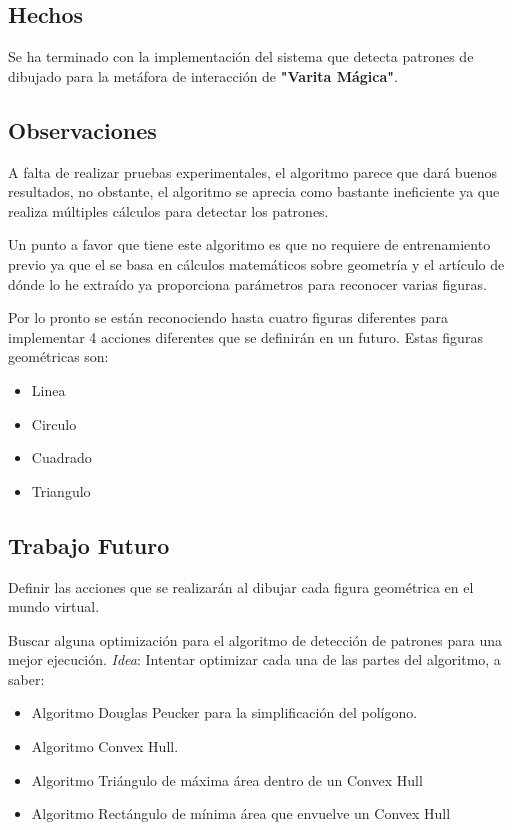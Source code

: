 \documentclass[12pt,a4paper]{article}
\begin{document}
\subsection{Hechos}

Se ha terminado con la implementación del sistema que detecta patrones de dibujado para la metáfora de interacción de \textbf{"Varita Mágica"}.

\subsection{Observaciones}

A falta de realizar pruebas experimentales, el algoritmo parece que dará buenos resultados, no obstante, el algoritmo se aprecia como bastante ineficiente ya que realiza múltiples cálculos para detectar los patrones.

Un punto a favor que tiene este algoritmo es que no requiere de entrenamiento previo ya que el se basa en cálculos matemáticos sobre geometría y el artículo de dónde lo he extraído \cite{Vanhatalo} ya proporciona parámetros para reconocer varias figuras.

Por lo pronto se están reconociendo hasta cuatro figuras diferentes para implementar 4 acciones diferentes que se definirán en un futuro. Estas figuras geométricas son:

\begin{itemize}
\item Linea
\item Circulo
\item Cuadrado
\item Triangulo
\end{itemize}

\subsection{Trabajo Futuro}

Definir las acciones que se realizarán al dibujar cada figura geométrica en el mundo virtual.

Buscar alguna optimización para el algoritmo de detección de patrones para una mejor ejecución. 
\textit{Idea}: Intentar optimizar cada una de las partes del algoritmo, a saber:

\begin{itemize}
\item Algoritmo Douglas Peucker para la simplificación del polígono.
\item Algoritmo Convex Hull.
\item Algoritmo Triángulo de máxima área dentro de un Convex Hull
\item Algoritmo Rectángulo de mínima área que envuelve un Convex Hull
\end{itemize}
\end{document}
